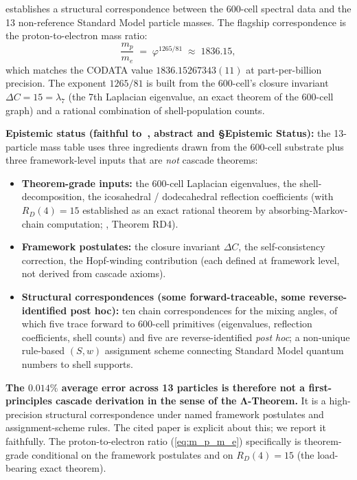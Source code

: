 \documentclass[11pt]{article}
\theoremstyle{plain}
\theoremstyle{definition}
\theoremstyle{remark}
\begin{document}
\citet{SmartV} establishes a structural correspondence between the 600-cell spectral data and the 13 non-reference Standard Model particle masses. The flagship correspondence is the proton-to-electron mass ratio:
\begin{equation}\label{eq:m_p_m_e}
  \frac{m_p}{m_e} \;=\; \varphi^{1265/81} \;\approx\; 1836.15,
\end{equation}
which matches the CODATA value $1836.15267343(11)$ at part-per-billion precision. The exponent $1265/81$ is built from the 600-cell's closure invariant $\Delta C = 15 = \lambda_7$ (the 7th Laplacian eigenvalue, an exact theorem of the 600-cell graph) and a rational combination of shell-population counts.

\textbf{Epistemic status (faithful to~\citealp{SmartV}, abstract and \S Epistemic Status):} the 13-particle mass table uses three ingredients drawn from the 600-cell substrate plus three framework-level inputs that are \emph{not} cascade theorems:
\begin{itemize}[leftmargin=2em]
\item \textbf{Theorem-grade inputs:} the 600-cell Laplacian eigenvalues, the shell-decomposition, the icosahedral / dodecahedral reflection coefficients (with $R_D(4) = 15$ established as an exact rational theorem by absorbing-Markov-chain computation; \citealp{SmartV}, Theorem RD4).
\item \textbf{Framework postulates:} the closure invariant $\Delta C$, the self-consistency correction, the Hopf-winding contribution (each defined at framework level, not derived from cascade axioms).
\item \textbf{Structural correspondences (some forward-traceable, some reverse-identified post hoc):} ten chain correspondences for the mixing angles, of which five trace forward to 600-cell primitives (eigenvalues, reflection coefficients, shell counts) and five are reverse-identified \emph{post hoc}; a non-unique rule-based $(S, w)$ assignment scheme connecting Standard Model quantum numbers to shell supports.
\end{itemize}
\textbf{The $0.014\%$ average error across 13 particles is therefore not a first-principles cascade derivation in the sense of the Λ-Theorem.} It is a high-precision structural correspondence under named framework postulates and assignment-scheme rules. The cited paper is explicit about this; we report it faithfully. The proton-to-electron ratio (\ref{eq:m_p_m_e}) specifically is theorem-grade conditional on the framework postulates and on $R_D(4) = 15$ (the load-bearing exact theorem).
\end{document}
